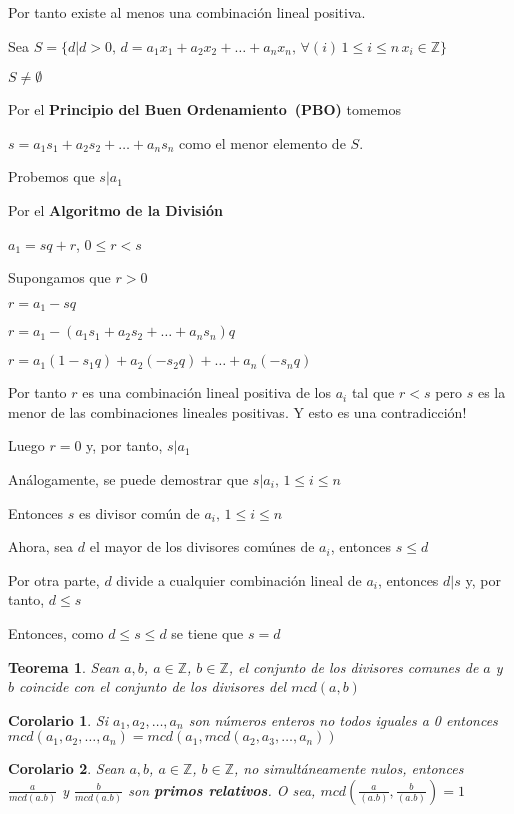 \documentclass[a4paper,1pt]{report}
\newtheorem*{teo}{Teorema}
\newtheorem*{cor}{Corolario}
\begin{document}
Por tanto existe al menos una combinación lineal positiva.

Sea $S=\{d|d>0,\, d = a_1x_1+a_2x_2+\dots+a_nx_n,\, \forall (i)\, 1\leq i \leq n\, x_i\in\mathbb{Z}\}$

$S\neq \emptyset$

Por el \textbf{Principio del Buen Ordenamiento~(PBO)} tomemos 

$s=a_1s_1+a_2s_2+\dots+a_ns_n$ como el menor elemento de $S$.

Probemos que $s|a_1$

Por el \textbf{Algoritmo de la División}

$a_1=sq+r$, $0\leq r < s$ 

Supongamos que $r>0$

$r=a_1-sq$

$r=a_1 - (a_1s_1+a_2s_2+\dots+a_ns_n)q$

$r=a_1(1-s_1q)+a_2(-s_2q)+\dots+a_n(-s_nq)$

Por tanto $r$ es una combinación lineal positiva de los $a_i$ tal que $r<s$ pero $s$ es la menor de las combinaciones lineales positivas. Y esto es una contradicción! 

Luego $r=0$ y, por tanto, $s|a_1$

Análogamente, se puede demostrar que $s|a_i,\, 1\leq i \leq n$

Entonces $s$ es divisor común de $a_i,\, 1\leq i \leq n$

Ahora, sea $d$ el mayor de los divisores comúnes de $a_i$, entonces $s\leq d$

Por otra parte, $d$ divide a cualquier combinación lineal de $a_i$, entonces $d|s$ y, por tanto, $d\leq s$

Entonces, como $d\leq s \leq d$ se tiene que $s=d$

\begin{teo}
 Sean $a,b$, $a\in\mathbb{Z}$, $b\in\mathbb{Z}$, el conjunto de los divisores comunes de $a$ y $b$ coincide con el conjunto de los divisores del $mcd(a,b)$
\end{teo}

\begin{cor}
 Si $a_1,a_2,\dots,a_n$ son números enteros no todos iguales a 0 entonces $mcd(a_1,a_2,\dots,a_n)=mcd(a_1,mcd(a_2,a_3,\dots,a_n))$
\end{cor}

\begin{cor}
 Sean $a,b$, $a\in\mathbb{Z}$, $b\in\mathbb{Z}$, no simultáneamente nulos, entonces $\frac{a}{mcd(a.b)}$ y  $\frac{b}{mcd(a.b)}$ son \textbf{primos relativos}. O sea, $mcd(\frac{a}{(a.b)},\frac{b}{(a.b)})=1$
\end{cor}
\end{document}
